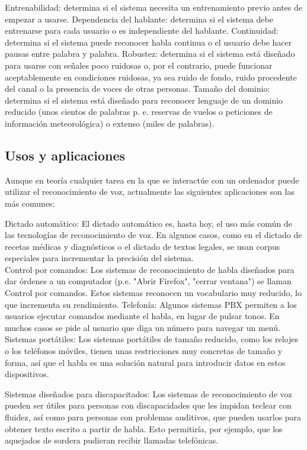 \documentclass[a4paper,11pt]{article}
\begin{document}
Entrenabilidad: determina si el sistema necesita un entrenamiento previo antes de empezar a usarse.
Dependencia del hablante: determina si el sistema debe entrenarse para cada usuario o es independiente del hablante.
Continuidad: determina si el sistema puede reconocer habla continua o el usuario debe hacer pausas entre palabra y palabra.
Robustez: determina si el sistema está diseñado para usarse con señales poco ruidosas o, por el contrario, puede funcionar aceptablemente en condiciones ruidosas, ya sea ruido de fondo, ruido procedente del canal o la presencia de voces de otras personas.
Tamaño del dominio: determina si el sistema está diseñado para reconocer lenguaje de un dominio reducido (unos cientos de palabras p. e. reservas de vuelos o peticiones de información meteorológica) o extenso (miles de palabras).

\subsection{Usos y aplicaciones}
Aunque en teoría cualquier tarea en la que se interactúe con un ordenador puede utilizar el reconocimiento de voz, actualmente las siguientes aplicaciones son las más comunes:

Dictado automático: El dictado automático es, hasta hoy, el uso más común de las tecnologías de reconocimiento de voz. En algunos casos, como en el dictado de recetas médicas y diagnósticos o el dictado de textos legales, se usan corpus especiales para incrementar la precisión del sistema.\\

Control por comandos: Los sistemas de reconocimiento de habla diseñados para dar órdenes a un computador (p.e. "Abrir Firefox", "cerrar ventana") se llaman Control por comandos. Estos sistemas reconocen un vocabulario muy reducido, lo que incrementa su rendimiento.
Telefonía: Algunos sistemas PBX permiten a los usuarios ejecutar comandos mediante el habla, en lugar de pulsar tonos. En muchos casos se pide al usuario que diga un número para navegar un menú.  \\

Sistemas portátiles: Los sistemas portátiles de tamaño reducido, como los relojes o los teléfonos móviles, tienen unas restricciones muy concretas de tamaño y forma, así que el habla es una solución natural para introducir datos en estos dispositivos.

Sistemas diseñados para discapacitados: Los sistemas de reconocimiento de voz pueden ser útiles para personas con discapacidades que les impidan teclear con fluidez, así como para personas con problemas auditivos, que pueden usarlos para obtener texto escrito a partir de habla. Esto permitiría, por ejemplo, que los aquejados de sordera pudieran recibir llamadas telefónicas.
\end{document}
